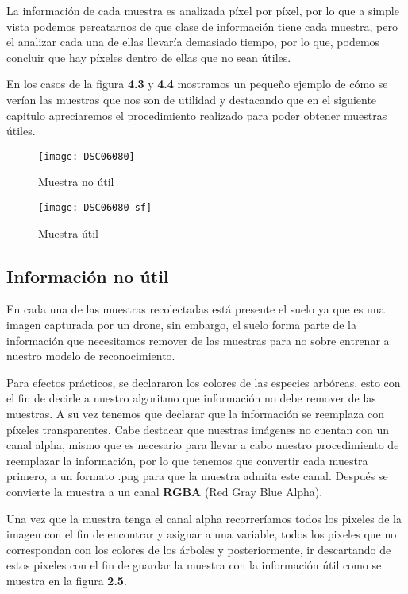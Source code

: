 La información de cada muestra es analizada píxel por píxel, por lo que a simple vista podemos percatarnos de que clase de información tiene cada muestra, pero el analizar cada una de ellas llevaría demasiado tiempo, por lo que, podemos concluir que hay píxeles dentro de ellas que no sean útiles. 

En los casos de la figura \textbf{4.3} y \textbf{4.4} mostramos un pequeño ejemplo de cómo se verían las muestras que nos son de utilidad y destacando que en el siguiente capitulo apreciaremos el procedimiento realizado para poder obtener muestras útiles.

\begin{figure}[b]
  \centering
  \begin{minipage}[b]{0.4\textwidth}
    \texttt{[image: DSC06080]}
    \caption{Muestra no útil}
  \end{minipage}
  \hfill
  \begin{minipage}[b]{0.4\textwidth}
    \texttt{[image: DSC06080-sf]}
    \caption{Muestra útil}
  \end{minipage}
\end{figure}

\newpage

\subsection{Información no útil}
En cada una de las muestras recolectadas está presente el suelo ya que es una imagen capturada por un drone, sin embargo, el suelo forma parte de la información que necesitamos remover de las muestras para no sobre entrenar a nuestro modelo de reconocimiento.

Para efectos prácticos, se declararon los colores de las especies arbóreas, esto con el fin de decirle a nuestro algoritmo que información no debe remover de las muestras. A su vez tenemos que declarar que la información se reemplaza con píxeles transparentes. Cabe destacar que nuestras imágenes no cuentan con un canal alpha, mismo que es necesario para llevar a cabo nuestro procedimiento de reemplazar la información, por lo que tenemos que convertir cada muestra primero, a un formato .png para que la muestra admita este canal. Después se convierte la muestra a un canal \textbf{RGBA} (Red Gray Blue Alpha).

 Una vez que la muestra tenga el canal alpha recorreríamos todos los pixeles de la imagen con el fin de encontrar y asignar a una variable, todos los pixeles que no correspondan con los colores de los árboles y posteriormente, ir descartando de estos pixeles con el fin de guardar la muestra con la información útil como se muestra en la figura \textbf{2.5}.

